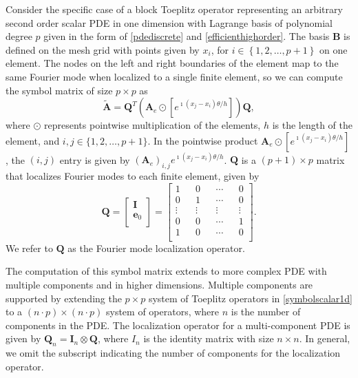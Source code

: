 \documentclass[review]{siamart190516}
\begin{document}
Consider the specific case of a block Toeplitz operator representing an arbitrary second order scalar PDE in one dimension with Lagrange basis of polynomial degree $p$ given in the form of \cref{pdediscrete} and \cref{efficienthighorder}.
The basis $\mathbf{B}$ is defined on the mesh grid with points given by $x_i$, for $i \in \left\lbrace 1, 2, \dots, p + 1 \right\rbrace$ on one element.
The nodes on the left and right boundaries of the element map to the same Fourier mode when localized to a single finite element, so we can compute the symbol matrix of size $p \times p$ as
\begin{equation}\label{symbolscalar1d}
\tilde{\mathbf{A}} = \mathbf{Q}^T \left( \mathbf{A}_e \odot \left[ e^{\imath \left( x_j - x_i \right) \theta / h} \right] \right) \mathbf{Q},
\end{equation}
where $\odot$ represents pointwise multiplication of the elements, $h$ is the length of the element, and $i, j \in \lbrace 1, 2, \dots, p + 1 \rbrace$.
In the pointwise product $\mathbf{A}_e \odot \left[ e^{\imath \left( x_j - x_i \right) \theta / h} \right]$, the $\left( i, j \right)$ entry is given by $\left( \mathbf{A}_e \right)_{i, j} e^{\imath \left( x_j - x_i \right) \theta / h}$.
$\mathbf{Q}$ is a $\left( p + 1 \right) \times p$ matrix that localizes Fourier modes to each finite element, given by
\begin{equation}
\mathbf{Q} =
\begin{bmatrix}
    \mathbf{I}   \\
    \mathbf{e}_0 \\
\end{bmatrix} =
\begin{bmatrix}
    1      && 0      && \cdots && 0      \\
    0      && 1      && \cdots && 0      \\
    \vdots && \vdots && \vdots && \vdots \\
    0      && 0      && \cdots && 1      \\
    1      && 0      && \cdots && 0      \\
\end{bmatrix}.
\end{equation}
We refer to $\mathbf{Q}$ as the Fourier mode localization operator.

The computation of this symbol matrix extends to more complex PDE with multiple components and in higher dimensions.
Multiple components are supported by extending the $p \times p$ system of Toeplitz operators in \cref{symbolscalar1d} to a $\left( n \cdot p \right) \times \left( n \cdot p \right)$ system of operators, where $n$ is the number of components in the PDE.
The localization operator for a multi-component PDE is given by $\mathbf{Q}_n = \mathbf{I}_n \otimes \mathbf{Q}$, where $I_n$ is the identity matrix with size $n \times n$.
In general, we omit the subscript indicating the number of components for the localization operator.
\end{document}
